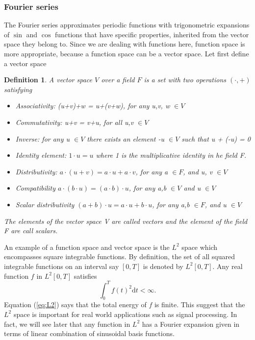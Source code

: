 \documentclass[11pt, oneside]{article}   	%
\newtheorem{definition}{Definition}
\begin{document}
\subsubsection{Fourier series}
The Fourier series approximates periodic functions with trigonometric expansions of $\sin$ and $\cos$ functions that have specific properties, inherited from the vector space they belong to.
Since we are dealing with functions here, function space is more appropriate, because a function space can be a vector space. Let first define a vector space
\begin{definition}
A vector space $V$ over a field $F$ is a set  with two operations $(\cdot, +)$ satisfying 
\begin{itemize}
\item Associativity:  (u+v)+w = u+(v+w), for any u,v, w $\in V$
\item Commutativity: u+v = v+u, for all u,v $\in V$
\item Inverse: for any u $\in V$ there exists an element -u $\in V$ such that u + (-u) = 0
\item Identity element: $1\cdot u = u$ where 1 is the multiplicative identity in he field F.
\item Distributivity: $a\cdot(u+v) = a\cdot u + a\cdot v$, for any a $\in F$, and u, v $\in V$
\item Compatibility $a\cdot(b\cdot u) = (a\cdot b)\cdot u$, for any a,b $\in V$ and u $\in V$
\item Scalar distributivity $(a+b)\cdot u = a\cdot u + b\cdot u$, for any a,b $\in F$, and u $\in V$
\end{itemize}
The elements of the vector space V are called vectors and the element of the field F are call scalars.
\end{definition}
An example of a function space and vector space is the $L^{2}$ space which encompasses square integrable functions. By definition, the set of all squared integrable functions on an interval say $[0,T]$ is denoted by 
$L^{2}[0,T]$. Any real function $f$ in $L^{2}[0,T]$ satisfies
\begin{equation} \label{eq:L2}
\int_{0}^{T}f(t)^{2}\mathrm{d}t < \infty.
\end{equation}
Equation (\ref{eq:L2}) says that the total energy of $f$ is finite. This suggest that the $L^{2}$ space is important for real world applications such as signal processing. In fact, we will see  later that any function in $L^{2}$ has a Fourier expansion given in terms of linear combination of sinusoidal basis functions. 
\justify
\end{document}
